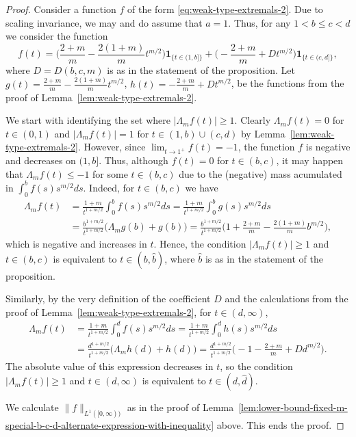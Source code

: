 \documentclass[a4paper]{amsart} %
\theoremstyle{definition}
\theoremstyle{remark}
\numberwithin{equation}{section}
\newcommand*{\ind}[1]{\mathbf{1}_{#1}}
\newcommand*{\indbr}[1]{\ind{\{#1\}}}
\newcommand*{\fZero}{g}
\newcommand*{\fOne}{h}
\newcommand*{\dOne}{D}%
\newcommand*{\bGain}{\widehat{b}}
\newcommand*{\dGain}{\widehat{d}}
\begin{document}
\begin{proof}
	Consider a function  $f$ of the form \eqref{eq:weak-type-extremals-2}. 
	Due to scaling invariance,
	we may and do assume that $a=1$.
	Thus, for  any $1 < b \leq c <d$ we consider the function
	\[
	f(t) = \bigl(\frac{2+m}{m} -\frac{2(1+m)}{m} t^{m/2}\bigr) \indbr{t\in (1,b]}
	+  \bigl( -\frac{2+m}{m} + \dOne t^{m/2}\bigr)\indbr{t\in(c,d]},
	\]
	where $\dOne = \dOne(b,c,m) $ is as in the statement of the proposition.
	Let $\fZero(t)=  \frac{2+m}{m} - \frac{2(1+m)}{m} t^{m/2}$, $\fOne(t)=   -\frac{2+m}{m} + \dOne t^{m/2}$,
	be the functions from the proof of Lemma~\ref{lem:weak-type-extremals-2}.
	
	
	
	We start with identifying the set where $|\Lambda_m f (t)| \geq 1$.
	Clearly
	$ \Lambda_m f(t) =0$ for $t\in(0,1)$ 
	and $|\Lambda_m f(t)| = 1$ for $t\in (1,b) \cup (c,d)$
	by Lemma~\ref{lem:weak-type-extremals-2}.
	However, since $\lim_{t\to 1^+} f(t) = -1 $,
	the function $f$ is negative and decreases on $(1,b]$.
	Thus,
	although $f(t) = 0$ for $t\in (b,c)$,
	it may happen that $\Lambda_m f(t) \leq -1$ for some $t\in(b,c)$
	due to the (negative) mass acumulated in $\int_0^b f(s) s^{m/2} ds$.
	Indeed, for $t\in (b,c)$ we have
	\begin{align*}
	\Lambda_m f(t)
	&= \frac{1+m}{t^{1+m/2}} \int_0^b f(s) s^{m/2}ds
	= \frac{1+m}{t^{1+m/2}} \int_0^b \fZero(s) s^{m/2}ds\\
	&= \frac{b^{1+m/2}}{t^{1+m/2}} \bigl( \Lambda_m \fZero(b) + \fZero(b)\bigr)
	= \frac{b^{1+m/2}}{t^{1+m/2}} \bigl( 1 + \frac{2+m}{m}  - \frac{2(1+m)}{m} b^{m/2}\bigr), 
	\end{align*}
	which is negative and increases in $t$.
	Hence, the condition $|\Lambda_m f(t)| \geq 1$ and $t\in(b,c)$ is equivalent to $t\in(b, \bGain)$, where $\bGain$ is as in the statement of the proposition.
	
	Similarly, by the very definition of the coefficient $\dOne$ and the calculations from the proof of Lemma~\ref{lem:weak-type-extremals-2}, for $t\in(d,\infty)$,
	\begin{align*}
	\Lambda_m f(t)
	&= \frac{1+m}{t^{1+m/2}} \int_0^d f(s) s^{m/2}ds
	= \frac{1+m}{t^{1+m/2}} \int_0^d \fOne(s) s^{m/2}ds\\
	&= \frac{d^{1+m/2}}{t^{1+m/2}} \bigl( \Lambda_m \fOne(d) + \fOne(d)\bigr)
	= \frac{d^{1+m/2}}{t^{1+m/2}} \bigl( -1 - \frac{2+m}{m}  + \dOne d^{m/2}\bigr).
	\end{align*}
	The absolute value of this expression decreases in $t$,
	so the condition $|\Lambda_m f(t)| \geq 1$ and $t\in(d,\infty)$
	is equivalent to $t\in(d, \dGain)$.
	
	
	We calculate $\|f\|_{L^1([0, \infty))}$ as in the proof of Lemma~\ref{lem:lower-bound-fixed-m-special-b-c-d-alternate-expression-with-inequality} above.
	This ends the proof.
\end{proof}
\end{document}
